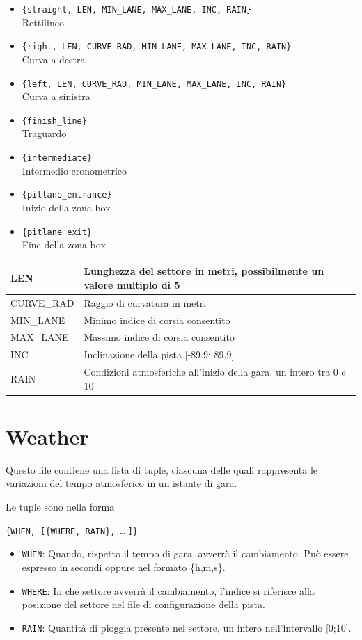 \documentclass[11pt,a4paper]{report}
\begin{document}
\begin{itemize}
\item \texttt{\{straight, LEN, MIN\_LANE, MAX\_LANE, INC, RAIN\}}\\ Rettilineo
\item \texttt{\{right, LEN, CURVE\_RAD, MIN\_LANE, MAX\_LANE, INC, RAIN\}}\\ Curva a destra
\item \texttt{\{left, LEN, CURVE\_RAD, MIN\_LANE, MAX\_LANE, INC, RAIN\}}\\ Curva a sinistra
\item \texttt{\{finish\_line\}}\\ Traguardo
\item \texttt{\{intermediate\}}\\ Intermedio cronometrico
\item \texttt{\{pitlane\_entrance\}}\\ Inizio della zona box
\item \texttt{\{pitlane\_exit\}}\\ Fine della zona box
\end{itemize}

\begin{center}
\begin{tabular}{|p{}|p{}|}
\hline
LEN & Lunghezza del settore in metri, possibilmente un valore multiplo di 5\\
\hline
CURVE\_RAD & Raggio di curvatura in metri\\
\hline
MIN\_LANE & Minimo indice di corsia consentito\\
\hline
MAX\_LANE & Massimo indice di corsia consentito\\
\hline
INC & Inclinazione della pista [-89.9; 89.9]\\
\hline
RAIN & Condizioni atmosferiche all'inizio della gara, un intero tra 0 e 10\\
\hline
\end{tabular}
\end{center}

\section*{Weather}
Questo file contiene una lista di tuple, ciascuna delle quali rappresenta le variazioni del tempo atmosferico in un istante di gara.

Le tuple sono nella forma
\begin{center}
\texttt{\{WHEN, [\{WHERE, RAIN\}, \dots $\;$]\}}
\end{center}
\begin{itemize}
\item \texttt{WHEN}: Quando, rispetto il tempo di gara, avverrà il cambiamento. Può essere espresso in secondi oppure nel formato \{h,m,s\}.
\item \texttt{WHERE}: In che settore avverrà il cambiamento, l'indice si riferisce alla posizione del settore nel file di configurazione della pista.
\item \texttt{RAIN}: Quantità di pioggia presente nel settore, un intero nell'intervallo [0;10].
\end{itemize}
\end{document}
